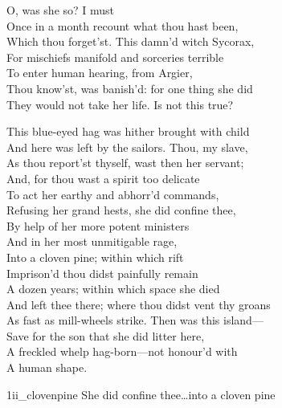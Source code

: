 \begin{verse_speech}[Prospero] 
O, was she so? I must\\
Once in a month recount what thou hast been,\\
Which thou forget'st. This damn'd witch Sycorax,\\
For mischiefs manifold and sorceries terrible\\
To enter human hearing, from Argier,\\
Thou know'st, was banish'd: for one thing she did\\
They would not take her life. Is not this true?
\end{verse_speech}


\begin{verse_speech}[Prospero] 
This blue-eyed hag was hither brought with child\\
And here was left by the sailors. Thou, my slave,\\
As thou report'st thyself, wast then her servant;\\
And, for thou wast a spirit too delicate\\
To act her earthy and abhorr'd commands,\\
Refusing her grand hests, she did confine thee,\\
By help of her more potent ministers\\
And in her most unmitigable rage,\\
Into a cloven pine; within which rift\\
Imprison'd thou didst painfully remain\\
A dozen years; within which space she died\\
And left thee there; where thou didst vent thy groans\\
As fast as mill-wheels strike. Then was this island—\\
Save for the son that she did litter here,\\
A freckled whelp hag-born—not honour'd with\\
A human shape.
\end{verse_speech}


\begin{pictures} %
	\begin{letter}
		\begin{colorbigpic}
			[1]
			{1ii_clovenpine}
			{She did confine thee\dots into a cloven pine}
		\end{colorbigpic}
	\end{letter}
\end{pictures}



